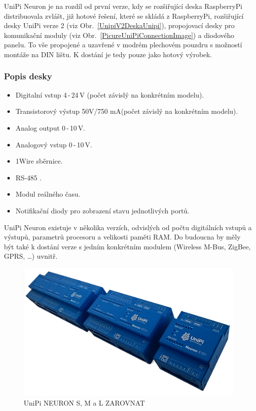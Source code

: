 UniPi Neuron je na rozdíl od první verze, kdy se rozšiřující deska RaspberryPi distribuovala zvlášt, již hotové řešení, které se skládá z RaspberryPi, rozšiřující desky UniPi verze 2 (viz Obr.~\ref{UnipiV2DeskaUnipi}), propojovací desky pro komunikační moduly (viz Obr.~\ref{PicureUniPiConnectionImage}) a diodového panelu. To vše propojené a uzavřené v modrém plechovém pouzdru s možností montáže na DIN lištu. K dostání je tedy pouze jako hotový výrobek.


\subsubsection{Popis desky}
\begin{itemize}
\item Digitalní vstup 4\,-\,24\,V (počet závislý na konkrétním modelu).
\item Transistorový výstup 50V/750 mA(počet závislý na konkrétním modelu).
\item Analog output 0\,-\,10\,V.
\item Analogový vstup 0\,-\,10\,V.
\item 1Wire sběrnice.
\item RS-485 .
\item Modul reálného času.
\item Notifikační diody pro zobrazení stavu jednotlivých portů.
\end{itemize}

UniPi Neuron existuje v několika verzích, odvislých od počtu digitálních vstupů a výstupů, parametrů procesoru a velikosti paměti RAM. Do budoucna by měly být také k dostání verze s jedním konkrétním modulem (Wireless M-Bus, ZigBee, GPRS, \ldots) uvnitř.

\newpage

 \begin{figure}[!ht]
  \begin{center}
    \includegraphics[scale=1.05]{obrazky/unipi_unipi_verze}
  \end{center}
  \caption{UniPi NEURON S, M a L  \cite{UniPiBoard2}   \colorbox[rgb]{1,0,0}{ZAROVNAT}}
\end{figure}


